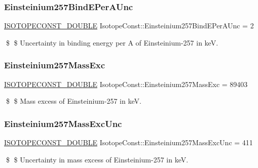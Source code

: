 \subsubsection{\texorpdfstring{Einsteinium257\+Bind\+E\+Per\+A\+Unc}{Einsteinium257BindEPerAUnc}}
{\footnotesize\ttfamily \mbox{\hyperlink{group___isotope_const-_macros_ga8f45a7272ce02c0b4c65c44636ed719a}{I\+S\+O\+T\+O\+P\+E\+C\+O\+N\+S\+T\+\_\+\+D\+O\+U\+B\+LE}} Isotope\+Const\+::\+Einsteinium257\+Bind\+E\+Per\+A\+Unc = 2}

\$ \$ Uncertainty in binding energy per A of Einsteinium-\/257 in keV. \mbox{\label{group___isotope_const-_einsteinium-_es257_gacd861c30bed4355d77f906b621021ed3}} 
\subsubsection{\texorpdfstring{Einsteinium257\+Mass\+Exc}{Einsteinium257MassExc}}
{\footnotesize\ttfamily \mbox{\hyperlink{group___isotope_const-_macros_ga8f45a7272ce02c0b4c65c44636ed719a}{I\+S\+O\+T\+O\+P\+E\+C\+O\+N\+S\+T\+\_\+\+D\+O\+U\+B\+LE}} Isotope\+Const\+::\+Einsteinium257\+Mass\+Exc = 89403}

\$ \$ Mass excess of Einsteinium-\/257 in keV. \mbox{\label{group___isotope_const-_einsteinium-_es257_gab885b225a299b464c17568a027aee73b}} 
\subsubsection{\texorpdfstring{Einsteinium257\+Mass\+Exc\+Unc}{Einsteinium257MassExcUnc}}
{\footnotesize\ttfamily \mbox{\hyperlink{group___isotope_const-_macros_ga8f45a7272ce02c0b4c65c44636ed719a}{I\+S\+O\+T\+O\+P\+E\+C\+O\+N\+S\+T\+\_\+\+D\+O\+U\+B\+LE}} Isotope\+Const\+::\+Einsteinium257\+Mass\+Exc\+Unc = 411}

\$ \$ Uncertainty in mass excess of Einsteinium-\/257 in keV. \mbox{\label{group___isotope_const-_einsteinium-_es257_gaf547cfbd0c6ba497164962c70b5edd17}} 
